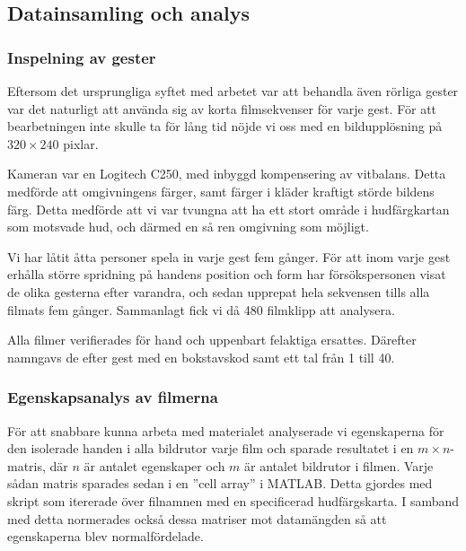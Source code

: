 \documentclass[../rapport_MVEX01-11-05]{subfiles}
\begin{document}
\subsection{Datainsamling och analys}

\subsubsection{Inspelning av gester}
Eftersom det ursprungliga syftet med arbetet var att behandla även rörliga
gester var det naturligt att använda sig av korta filmsekvenser för varje gest.
För att bearbetningen inte skulle ta för lång tid nöjde vi oss med en
bildupplösning på $320\times240$ pixlar.

Kameran var en Logitech C250, med inbyggd kompensering av vitbalans. Detta
medförde att omgivningens färger, samt färger i kläder kraftigt störde bildens 
färg. Detta medförde att vi var tvungna att ha ett stort område i hudfärgkartan
som motsvade hud, och därmed en så ren omgivning som möjligt.

Vi har låtit åtta personer spela in varje gest fem gånger.
För att inom varje gest erhålla större spridning på handens position och form
har försökspersonen visat de olika gesterna efter varandra, och sedan
upprepat hela sekvensen tills alla filmats fem gånger. Sammanlagt fick vi då 480
filmklipp att analysera.

Alla filmer verifierades för hand och uppenbart felaktiga ersattes. Därefter
namngavs de efter gest med en bokstavskod samt ett tal från 1 till 40.

\subsubsection{Egenskapsanalys av filmerna}
För att snabbare kunna arbeta med materialet analyserade vi
egenskaperna för den isolerade handen i alla bildrutor varje film och sparade
resultatet i en $m\times n$-matris, där $n$ är antalet egenskaper och $m$ är
antalet bildrutor i filmen. Varje sådan matris sparades sedan i en ''cell array''
i MATLAB. Detta gjordes med skript som itererade över filnamnen
med en specificerad hudfärgskarta. I samband med detta normerades också dessa
matriser mot datamängden så att egenskaperna blev normalfördelade.
\end{document}
